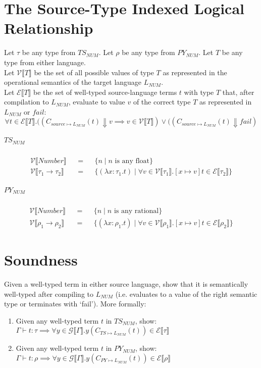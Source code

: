 \documentclass{article}
\newcommand{\makedenoteset}[3]{\mathcal{#1} \llbracket #2 \rrbracket && = && \{#3\}}
\newcommand{\denoteset}[2]{\mathcal{#1} \llbracket #2 \rrbracket}
\begin{document}
	\section{The Source-Type Indexed Logical Relationship}
	
	Let $\tau$ be any type from $TS_{NUM}$. Let $\rho$ be any type from $PY_{NUM}$. Let $T$ be any type from either language.\\
	
	Let $\denoteset{V}{T}$ be the set of all possible values of type $T$ as represented in the operational semantics of the target language $L_{NUM}$.\\
	
	Let $\denoteset{E}{T}$ be the set of well-typed source-language terms $t$ with type $T$ that, after compilation to $L_{NUM}$, evaluate to value $v$ of the correct type $T$ as represented in $L_{NUM}$ or $fail$:
	\[
		\forall t \in \denoteset{E}{T}. ((C_{source \mapsto L_{NUM}}(t) \Downarrow v \implies v \in \denoteset{V}{T}) \lor ((C_{source \mapsto L_{NUM}}(t) \Downarrow fail)
	\]

	
	\subparagraph{$TS_{NUM}$}
	\begin{align*}
		\makedenoteset{V}{Number}{n \mid n \text{ is any float}}\\
		\makedenoteset{V}{\tau_1 \rightarrow \tau_2}{
				(\lambda x\colon \tau_1.t)  \mid
				\forall v \in \denoteset{V}{\tau_1}.[x \mapsto v]t \in \denoteset{E}{\tau_2}
		}
	\end{align*}
	
	\subparagraph{$PY_{NUM}$}
	\begin{align*}
		\makedenoteset{V}{Number}{n \mid n \text{ is any rational}}\\
		\makedenoteset{V}{\rho_1 \rightarrow \rho_2}{
			(\lambda x: \rho_1.t) \mid
			\forall v \in \denoteset{V}{\rho_1}.[x \mapsto v]t \in \denoteset{E}{\rho_2}
		}
	\end{align*}
	
	\section{Soundness}

	Given a well-typed term in either source language, show that it is semantically well-typed after compiling to $L_{NUM}$ (i.e. evaluates to a value of the right semantic type or terminates with `fail'). More formally:
	
	\begin{enumerate}
		\item Given any well-typed term $t$ in $TS_{NUM}$, show:\\
		$\Gamma \vdash t: \tau \implies \forall y \in \denoteset{G}{\Gamma}. y(C_{TS \mapsto L_{NUM}}(t)) \in \denoteset{E}{\tau}$
		\item Given any well-typed term $t$ in $PY_{NUM}$, show:\\
		$\Gamma \vdash t: \rho \implies \forall y \in \denoteset{G}{\Gamma}. y(C_{PY \mapsto L_{NUM}}(t)) \in \denoteset{E}{\rho}$
	\end{enumerate}
\end{document}
